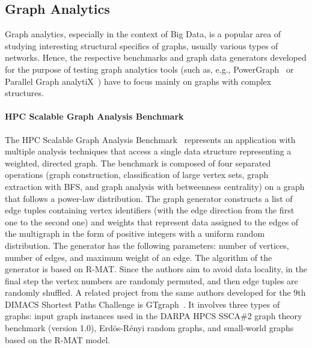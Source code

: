 \subsection{Graph Analytics}
\label{sec:generators_analytics}

Graph analytics, especially in the context of Big Data, is a popular area of studying interesting structural specifics of graphs, usually various types of networks.  Hence, the respective benchmarks and graph data generators developed for the purpose of testing graph analytics tools (such as, e.g.,  PowerGraph~\cite{Gonzalez:2012:PDG:2387880.2387883} or Parallel Graph analytiX~\cite{Sevenich:2016:UDL:3007263.3007265}) have to focus mainly on graphs with complex structures.

\paragraph{HPC Scalable Graph Analysis Benchmark} The HPC Scalable Graph
Analysis Benchmark~\cite{HPCgraph,Bader:2005:DIH:2099301.2099360} represents an
application with multiple analysis techniques that access a single data
structure representing a weighted, directed graph. The benchmark is composed of
four separated operations (graph construction, classification of large vertex
sets, graph extraction with BFS, and graph analysis with betweenness centrality)
on a graph that follows a power-law distribution. The graph generator constructs a list of edge tuples containing vertex
identifiers (with the edge direction from the first one to the second one) and
weights that represent data assigned to the edges of the multigraph in the form
of positive integers with a uniform random distribution. The generator has the
following parameters: number of vertices, number of edges, and maximum weight of
an edge. The algorithm of the generator is based on R-MAT. Since the authors aim
to avoid data locality, in the final step the vertex numbers are randomly
permuted, and then edge tuples are randomly shuffled. A related project from the same authors developed for the 9th DIMACS Shortest
Paths Challenge is GTgraph~\cite{GTgraph}. It involves three types of graphs:
input graph instances used in the DARPA HPCS SSCA\#2 graph theory benchmark
(version 1.0), Erd\"{o}s-R\'{e}nyi random graphs, and small-world graphs based
on the R-MAT model.

